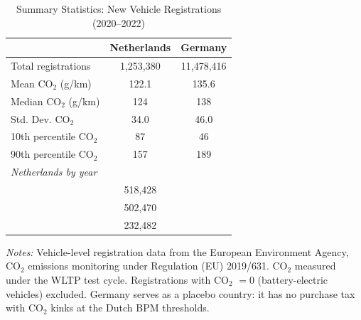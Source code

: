 \begin{table}[t]
\centering
\begin{threeparttable}
\caption{Summary Statistics: New Vehicle Registrations (2020--2022)}
\label{tab:summary}
\begin{tabular}{lcc}
\toprule
 & Netherlands & Germany \\
\midrule
Total registrations & 1,253,380 & 11,478,416 \\
Mean CO$_2$ (g/km) & 122.1 & 135.6 \\
Median CO$_2$ (g/km) & 124 & 138 \\
Std. Dev. CO$_2$ & 34.0 & 46.0 \\
10th percentile CO$_2$ & 87 & 46 \\
90th percentile CO$_2$ & 157 & 189 \\
\midrule
\multicolumn{3}{l}{\textit{Netherlands by year}} \\
\quad 2020 & 518,428 & \\
\quad 2021 & 502,470 & \\
\quad 2022 & 232,482 & \\
\bottomrule
\end{tabular}
\begin{tablenotes}
\item \textit{Notes:} Vehicle-level registration data from the European Environment Agency, CO$_2$ emissions monitoring under Regulation (EU) 2019/631. CO$_2$ measured under the WLTP test cycle. Registrations with CO$_2$ $= 0$ (battery-electric vehicles) excluded. Germany serves as a placebo country: it has no purchase tax with CO$_2$ kinks at the Dutch BPM thresholds.
\end{tablenotes}
\end{threeparttable}
\end{table}


